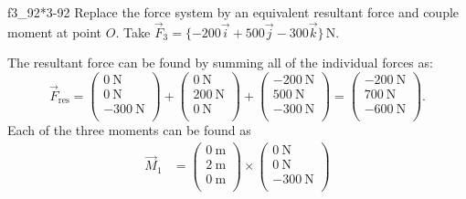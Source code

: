 
\begin{problemwithimage}{f3_92}{*3-92}
  Replace the force system by an equivalent resultant force and couple moment at point $O$.
  Take $\Vec{F}_3 = \{ -200 \Vec{i} + 500 \Vec{j} - 300 \Vec{k} \} \,  \unit{\N}$.
\end{problemwithimage}

\begin{derivation}
  The resultant force can be found by summing all of the individual forces as:
  \begin{equation*}
    \Vec{F}_{\mathrm{res}} = \begin{pmatrix}
    \qty{0}{\N}\\
    \qty{0}{\N} \\
    -\qty{300}{\N} \\
    \end{pmatrix} + \begin{pmatrix}
      \qty{0}{\N} \\
    \qty{200}{\N} \\
    \qty{0}{\N} \\
    \end{pmatrix} + \begin{pmatrix}
      - \qty{200}{\N} \\
    \qty{500}{\N} \\
    - \qty{300}{\N} \\
    \end{pmatrix} = \begin{pmatrix}
      - \qty{200}{\N} \\
    \qty{700}{\N} \\
    -\qty{600}{\N} \\
    \end{pmatrix}
  .\end{equation*}
  Each of the three moments can be found as
  \begin{align*}
    \Vec{M}_1 &= \begin{pmatrix}
      \qty{0}{\m} \\
    \qty{2}{\m} \\
    \qty{0}{\m} \\
    \end{pmatrix} \times \begin{pmatrix}
      \qty{0}{\N} \\
    \qty{0}{\N} \\
    - \qty{300}{\N} \\

\end{pmatrix}
\end{align*}
\end{derivation}
